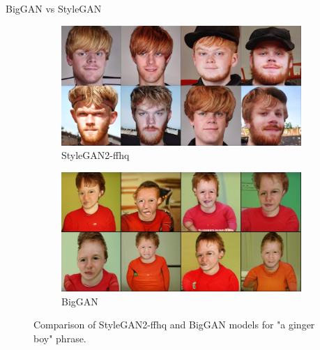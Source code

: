 \documentclass[t]{beamer}
\begin{document}
\begin{frame}[c]{BigGAN vs StyleGAN}
\begin{figure}[H]
\centering
\begin{subfigure}[b]{0.6\textwidth}
   \includegraphics[width=1\linewidth]{gingerboy_stylegan.PNG}
   \caption{StyleGAN2-ffhq}
   \label{fig:Ng1} 
\end{subfigure}

\begin{subfigure}[b]{0.6\textwidth}
   \includegraphics[width=1\linewidth]{gingerboy_biggan.PNG}
   \caption{BigGAN}
   \label{fig:Ng2}
\end{subfigure}
\caption[pics]{Comparison of StyleGAN2-ffhq and BigGAN models for "a ginger boy" phrase.}
\end{figure}
\end{frame}
\end{document}
